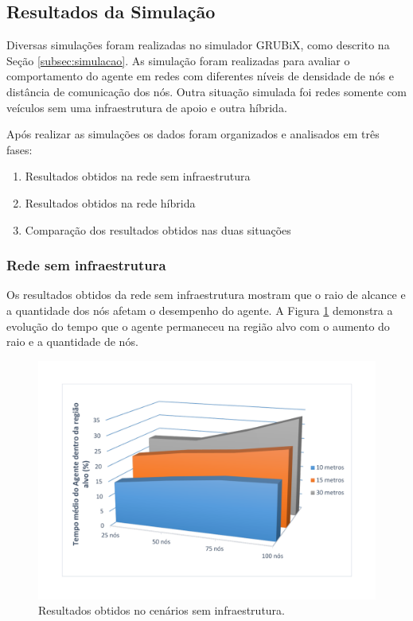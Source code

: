 	\subsection{Resultados da Simulação}
	\label{subsec:resultadoSimulacao}

	Diversas simulações foram realizadas no simulador GRUBiX, como descrito na Seção \ref{subsec:simulacao}. As simulação foram realizadas para avaliar o comportamento do agente em redes com diferentes níveis de densidade de nós e distância de comunicação dos nós. Outra situação simulada foi redes somente com veículos sem uma infraestrutura de apoio e outra híbrida.

	Após realizar as simulações os dados foram organizados e analisados em três fases:

	\begin{enumerate}
		\item Resultados obtidos na rede sem infraestrutura
		\item Resultados obtidos na rede híbrida
		\item Comparação dos resultados obtidos nas duas situações
	\end{enumerate} 

	\subsubsection{Rede sem infraestrutura}
	\label{subsubsection:redeSemInfraestruturaResultadoDiscucao}

	Os resultados obtidos da rede sem infraestrutura mostram que o raio de alcance e a quantidade dos nós afetam o desempenho do agente. A Figura \ref{fig:graficosSemTorres} demonstra a evolução do tempo que o agente permaneceu na região alvo com o aumento do raio e a quantidade de nós. 

	\begin{figure}[htbp]
		\centering
		\includegraphics[scale=0.34]{resultados/graficos/graficoSemTorres.pdf}
		\caption{Resultados obtidos no cenários sem infraestrutura.}
		\label{fig:graficosSemTorres}
	\end{figure}

